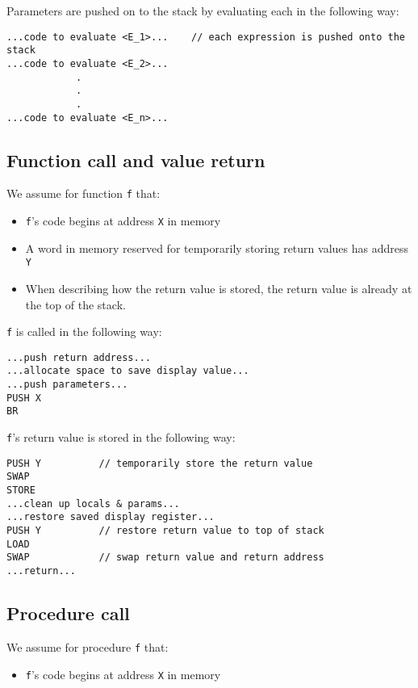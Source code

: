 \documentclass[11pt]{article}
\begin{document}
Parameters are pushed on to the stack by evaluating each in the following way:

\begin{verbatim}
...code to evaluate <E_1>...    // each expression is pushed onto the stack
...code to evaluate <E_2>...
            .
            .
            .
...code to evaluate <E_n>...
\end{verbatim}

\subsection{Function call and value return}

We assume for function \texttt{f} that:
    \begin{itemize}
    \item \texttt{f}'s code begins at address \texttt{X} in memory
    \item A word in memory reserved for temporarily storing return values has address \texttt{Y}
    \item When describing how the return value is stored, the return value is already at the top of the stack.
    \end{itemize}
    
\texttt{f} is called in the following way:
\begin{verbatim}
...push return address...
...allocate space to save display value...
...push parameters...
PUSH X
BR
\end{verbatim}

\texttt{f}'s return value is stored in the following way:
\begin{verbatim}
PUSH Y          // temporarily store the return value
SWAP
STORE
...clean up locals & params...
...restore saved display register...
PUSH Y          // restore return value to top of stack
LOAD
SWAP            // swap return value and return address
...return...
\end{verbatim}

\subsection{Procedure call}

We assume for procedure \texttt{f} that:
    \begin{itemize}
    \item \texttt{f}'s code begins at address \texttt{X} in memory
    \end{itemize}
    
\end{document}
